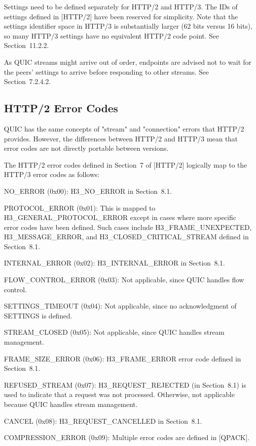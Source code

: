 \documentclass{article}
\begin{document}
Settings need to be defined separately for HTTP/2 and HTTP/3.  The IDs of settings defined in [HTTP/2] have been reserved for simplicity.  Note that the settings identifier space in HTTP/3 is substantially larger (62 bits versus 16 bits), so many HTTP/3 settings have no equivalent HTTP/2 code point.  See Section~11.2.2.

As QUIC streams might arrive out of order, endpoints are advised not to wait for the peers' settings to arrive before responding to other streams.  See Section~7.2.4.2.

\subsection{HTTP/2 Error Codes}

QUIC has the same concepts of "stream" and "connection" errors that HTTP/2 provides.  However, the differences between HTTP/2 and HTTP/3 mean that error codes are not directly portable between versions.

The HTTP/2 error codes defined in Section~7 of [HTTP/2] logically map to the HTTP/3 error codes as follows:

NO\_ERROR (0x00):  H3\_NO\_ERROR in Section~8.1.

PROTOCOL\_ERROR (0x01):  This is mapped to H3\_GENERAL\_PROTOCOL\_ERROR except in cases where more specific error codes have been defined. Such cases include H3\_FRAME\_UNEXPECTED, H3\_MESSAGE\_ERROR, and H3\_CLOSED\_CRITICAL\_STREAM defined in Section~8.1.

INTERNAL\_ERROR (0x02):  H3\_INTERNAL\_ERROR in Section~8.1.

FLOW\_CONTROL\_ERROR (0x03):  Not applicable, since QUIC handles flow control.

SETTINGS\_TIMEOUT (0x04):  Not applicable, since no acknowledgment of SETTINGS is defined.

STREAM\_CLOSED (0x05):  Not applicable, since QUIC handles stream management.

FRAME\_SIZE\_ERROR (0x06):  H3\_FRAME\_ERROR error code defined in Section~8.1.

REFUSED\_STREAM (0x07):  H3\_REQUEST\_REJECTED (in Section~8.1) is used to indicate that a request was not processed.  Otherwise, not applicable because QUIC handles stream management.

CANCEL (0x08):  H3\_REQUEST\_CANCELLED in Section~8.1.

COMPRESSION\_ERROR (0x09):  Multiple error codes are defined in [QPACK].
\end{document}
